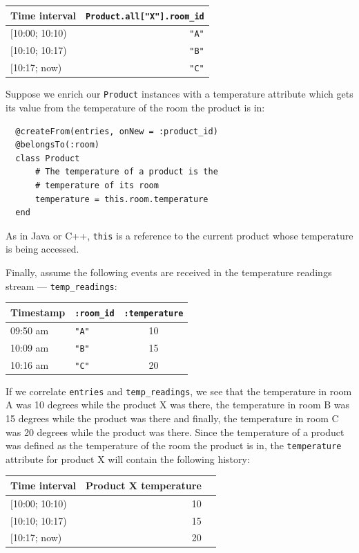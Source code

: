 \documentclass{report}
\begin{document}
\begin{tabular}{ |l|r| }
  \hline
  Time interval & \verb=Product.all["X"].room_id= \\
  \hline
  $[$10:00; 10:10) & \verb="A"= \\
  $[$10:10; 10:17) & \verb="B"= \\
  $[$10:17;   now) & \verb="C"= \\
  \hline
\end{tabular}

Suppose we enrich our \verb=Product= instances with a temperature
attribute which gets its value from the temperature of the room the
product is in:


\begin{lstlisting}
  @createFrom(entries, onNew = :product_id)
  @belongsTo(:room)
  class Product
      # The temperature of a product is the
      # temperature of its room
      temperature = this.room.temperature
  end
\end{lstlisting}

As in Java or C++, \verb=this= is a reference to the current product
whose temperature is being accessed.

Finally, assume the following events are received in the temperature
readings stream --- \verb=temp_readings=:

\begin{tabular}{ |l|l|c| }
  \hline
  Timestamp & \verb=:room_id= & \verb=:temperature= \\
  \hline
  09:50 am & \verb="A"= & 10 \\
  10:09 am & \verb="B"= & 15 \\
  10:16 am & \verb="C"= & 20 \\
  \hline
\end{tabular}

If we correlate \verb=entries= and \verb=temp_readings=, we see that
the temperature in room A was 10 degrees while the product X was
there, the temperature in room B was 15 degrees while the product was
there and finally, the temperature in room C was 20 degrees while the
product was there. Since the temperature of a product was defined as
the temperature of the room the product is in, the \verb=temperature=
attribute for product X will contain the following history:

\begin{tabular}{ |l|r|r| }
  \hline
 Time interval & Product X temperature \\
  \hline
  $[$10:00; 10:10) & 10 \\
  $[$10:10; 10:17) & 15 \\
  $[$10:17;   now) & 20 \\
  \hline
\end{tabular}
\end{document}
